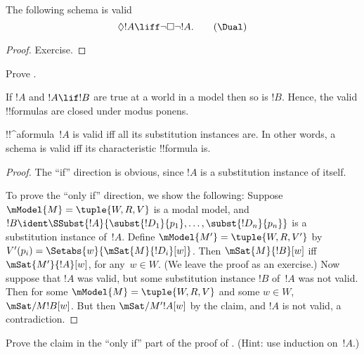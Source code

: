 \documentclass[../../../include/open-logic-section]{subfiles}
\begin{document}
\begin{prop}
  The following schema \Dual{} is valid
  \begin{equation*}
  \Diamond !A \liff \lnot\Box\lnot !A. \tag{\Dual}
  \end{equation*}
\end{prop}

\begin{proof}
  Exercise.
\end{proof}

\begin{prob}
  Prove .
\end{prob}

\begin{prop}
  If $!A$ and $!A \lif !B$ are true at a world in a model
  then so is $!B$. Hence, the valid !!{formula}s are closed under
  modus ponens.
\end{prop}

\begin{prop}
  !!^a{formula}~$!A$ is valid iff all its substitution instances
  are. In other words, a schema is valid iff its characteristic
  !!{formula} is.
\end{prop}

\begin{proof}
  The ``if'' direction is obvious, since $!A$ is a substitution
  instance of itself.

  To prove the ``only if'' direction, we show the following: Suppose
  $\mModel{M} = \tuple{W, R, V}$ is a modal model, and $!B \ident
  \SSubst{!A}{\subst{!D_1}{p_1},\dots,\subst{!D_n}{p_n}}$ is a
  substitution instance of~$!A$. Define $\mModel{M'} = \tuple{W, R,
    V'}$ by $V'(p_i) = \Setabs{w}{\mSat{M}{!D_i}[w]}$.  Then
  $\mSat{M}{!B}[w]$ iff $\mSat{M'}{!A}[w]$, for any~$w \in W$. (We
  leave the proof as an exercise.) Now suppose that $!A$ was valid,
  but some substitution instance $!B$ of~$!A$ was not valid. Then for
  some $\mModel{M} = \tuple{W, R, V}$ and some $w \in W$,
  $\mSat/{M}{!B}[w]$. But then $\mSat/{M'}{!A}[w]$ by the claim, and
  $!A$ is not valid, a contradiction.
\end{proof}

\begin{prob}
  Prove the claim in the ``only if'' part of the proof of
  . (Hint: use induction
  on~$!A$.)
\end{prob}
\end{document}
